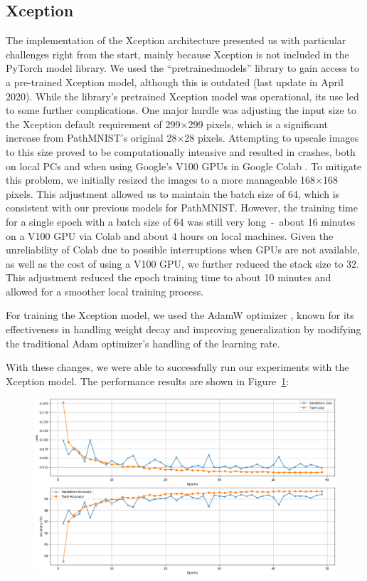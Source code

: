 \subsection{Xception}\label{resultsXceptions}

The implementation of the Xception architecture presented us with particular challenges right from the start, mainly because Xception is not included in the PyTorch model library. We used the ``pretrainedmodels'' library \citep{cadene2023pretrainedmodels} to gain access to a pre-trained Xception model, although this is outdated (last update in April 2020). While the library's pretrained Xception model was operational, its use led to some further complications.
One major hurdle was adjusting the input size to the Xception default requirement of 299$\times$299 pixels, which is a significant increase from PathMNIST's original 28$\times$28 pixels. Attempting to upscale images to this size proved to be computationally intensive and resulted in crashes, both on local PCs and when using Google's V100 GPUs in Google Colab \citep{googlecolab2024}. To mitigate this problem, we initially resized the images to a more manageable 168$\times$168 pixels. This adjustment allowed us to maintain the batch size of 64, which is consistent with our previous models for PathMNIST\@. However, the training time for a single epoch with a batch size of 64 was still very long~-~about 16 minutes on a V100 GPU via Colab and about 4 hours on local machines. Given the unreliability of Colab due to possible interruptions when GPUs are not available, as well as the cost of using a V100 GPU, we further reduced the stack size to 32. This adjustment reduced the epoch training time to about 10 minutes and allowed for a smoother local training process.

For training the Xception model, we used the AdamW optimizer \citep{loshchilov2019decoupled}, known for its effectiveness in handling weight decay and improving generalization by modifying the traditional Adam optimizer's handling of the learning rate.

With these changes, we were able to successfully run our experiments with the Xception model. The performance results are shown in Figure~\ref{fig:xception_PathMNIST}:

\begin{figure} [ht]
    \centering
    \includegraphics[width=.9\textwidth]{figures/xception_PathMNIST_result.png}
    \caption{}\label{fig:xception_PathMNIST}
\end{figure}